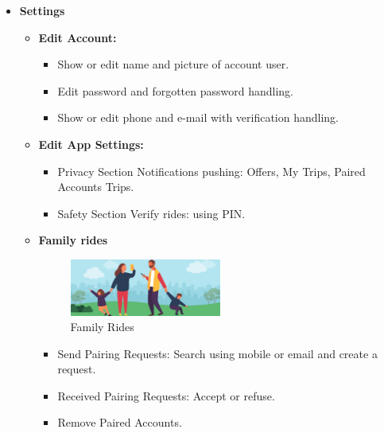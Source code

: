 \begin{enumerate}
\begin{itemize}
    \item  {\textbf{Settings}}
    \begin{itemize}
        \item {\textbf{Edit Account:}}
        \begin{itemize}
            \item Show or edit name and picture of account user.
            \item Edit password and forgotten password handling.
            \item Show or edit phone and e-mail with verification handling.
        \end{itemize}
        \item {\textbf{Edit App Settings:}}
        \begin{itemize}
            \item Privacy Section
            \newline Notifications pushing: Offers, My Trips, Paired Accounts Trips.
            \item Safety Section
            \newline Verify rides: using PIN.
        \end{itemize}
        \item {\textbf{Family rides}}
        \begin{figure}[http]%
    \center%
    \includegraphics[width=0.5\textwidth]{images/ch2/parents.jpg}%
    \caption[Family Rides]{Family Rides}\label{fig: Parents}%
 \end{figure}
        \begin{itemize}
            \item Send Pairing Requests: Search using mobile or email and create a request.
            \item Received Pairing Requests: Accept or refuse.
            \item Remove Paired Accounts.

\end{itemize}
\end{itemize}
\end{itemize}
\end{enumerate}
